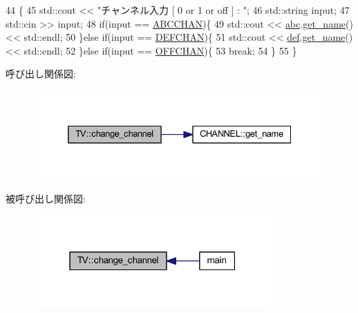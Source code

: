 \begin{DoxyCode}
44                          \{
45         std::cout << \textcolor{stringliteral}{"チャンネル入力 [ 0 or 1 or off ] : "};
46         std::string input;
47         std::cin >> input;
48         \textcolor{keywordflow}{if}(input == \hyperlink{chanel_8cpp_a513cb4309778b669aec8a3e5638079ac}{ABCCHAN})\{
49             std::cout << \hyperlink{class_t_v_a7bb8008571c1ca7539e937252503889b}{abc}.\hyperlink{class_c_h_a_n_n_e_l_aa9daccb6ddb609e501245fed29f0adfd}{get\_name}() << std::endl;
50         \}\textcolor{keywordflow}{else} \textcolor{keywordflow}{if}(input == \hyperlink{chanel_8cpp_aa9f5e75679b639a2c4ec2faf66372b86}{DEFCHAN})\{
51             std::cout << \hyperlink{class_t_v_ab5e13d7d33ed800b78ddb755b11b7fa2}{def}.\hyperlink{class_c_h_a_n_n_e_l_aa9daccb6ddb609e501245fed29f0adfd}{get\_name}() << std::endl;
52         \}\textcolor{keywordflow}{else} \textcolor{keywordflow}{if}(input == \hyperlink{chanel_8cpp_a0c1a83009ab44960907c64b7a1ad6135}{OFFCHAN})\{
53             \textcolor{keywordflow}{break};
54         \}
55     \}
\end{DoxyCode}
呼び出し関係図\+:\nopagebreak
\begin{figure}[H]
\begin{center}
\leavevmode
\includegraphics[width=332pt]{class_t_v_a26370b5928a57c9af9ed35f9c8f34ba4_cgraph}
\end{center}
\end{figure}
被呼び出し関係図\+:\nopagebreak
\begin{figure}[H]
\begin{center}
\leavevmode
\includegraphics[width=259pt]{class_t_v_a26370b5928a57c9af9ed35f9c8f34ba4_icgraph}
\end{center}
\end{figure}


